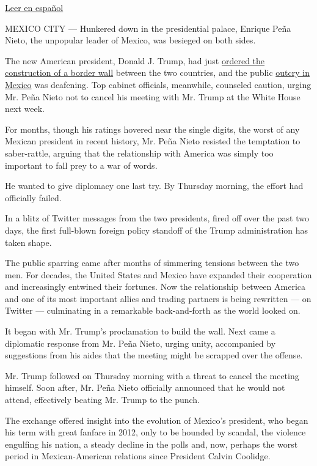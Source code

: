 \href{https://www.nytimes3xbfgragh.onion/es/2017/01/27/arrinconado-enrique-pena-nieto-responde-al-golpe-de-donald-trump/}{Leer
en español}

MEXICO CITY --- Hunkered down in the presidential palace, Enrique Peña
Nieto, the unpopular leader of Mexico, was besieged on both sides.

The new American president, Donald J. Trump, had just
\href{https://www.nytimes3xbfgragh.onion/2017/01/25/us/politics/refugees-immigrants-wall-trump.html}{ordered
the construction of a border wall} between the two countries, and the
public
\href{https://www.nytimes3xbfgragh.onion/2017/01/25/world/americas/trump-mexico-border-wall.html}{outcry
in Mexico} was deafening. Top cabinet officials, meanwhile, counseled
caution, urging Mr. Peña Nieto not to cancel his meeting with Mr. Trump
at the White House next week.

For months, though his ratings hovered near the single digits, the worst
of any Mexican president in recent history, Mr. Peña Nieto resisted the
temptation to saber-rattle, arguing that the relationship with America
was simply too important to fall prey to a war of words.

He wanted to give diplomacy one last try. By Thursday morning, the
effort had officially failed.

In a blitz of Twitter messages from the two presidents, fired off over
the past two days, the first full-blown foreign policy standoff of the
Trump administration has taken shape.

The public sparring came after months of simmering tensions between the
two men. For decades, the United States and Mexico have expanded their
cooperation and increasingly entwined their fortunes. Now the
relationship between America and one of its most important allies and
trading partners is being rewritten --- on Twitter --- culminating in a
remarkable back-and-forth as the world looked on.

It began with Mr. Trump's proclamation to build the wall. Next came a
diplomatic response from Mr. Peña Nieto, urging unity, accompanied by
suggestions from his aides that the meeting might be scrapped over the
offense.

Mr. Trump followed on Thursday morning with a threat to cancel the
meeting himself. Soon after, Mr. Peña Nieto officially announced that he
would not attend, effectively beating Mr. Trump to the punch.

The exchange offered insight into the evolution of Mexico's president,
who began his term with great fanfare in 2012, only to be hounded by
scandal, the violence engulfing his nation, a steady decline in the
polls and, now, perhaps the worst period in Mexican-American relations
since President Calvin Coolidge.

